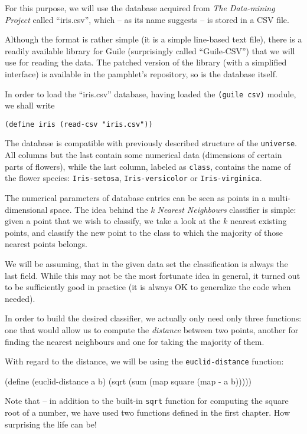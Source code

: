 For this purpose, we will use the database acquired from
\textit{The Data-mining Project} called ``iris.csv'', which
-- as its name suggests -- is stored in a CSV file.

Although the format is rather simple (it is a simple line-based
text file), there is a readily available library for Guile
(surprisingly called ``Guile-CSV'') that we will use for reading
the data. The patched version of the library (with a simplified
interface) is available in the pamphlet's repository, so is
the database itself.

In order to load the ``iris.csv'' database, having loaded
the \texttt{(guile csv)} module, we shall write 

\texttt{(define iris (read-csv "iris.csv"))}

The database is compatible with previously described structure
of the \texttt{universe}. All columns but the last contain
some numerical data (dimensions of certain parts of flowers),
while the last column, labeled as \texttt{class}, contains
the name of the flower species: \texttt{Iris-setosa},
\texttt{Iris-versicolor} or \texttt{Iris-virginica}.

The numerical parameters of database entries can be seen
as points in a multi-dimensional space. The idea behind
the \textit{k Nearest Neighbours} classifier is simple:
given a point that we wish to classify, we take a look
at the $k$ nearest existing points, and classify the new
point to the class to which the majority of those nearest
points belongs.

We will be assuming, that in the given data set
the classification is always the last field. While
this may not be the most fortunate idea in general,
it turned out to be sufficiently good in practice
(it is always OK to generalize the code when needed).

In order to build the desired classifier, we actually
only need only three functions: one that would allow
us to compute the \textit{distance} between two points,
another for finding the nearest neighbours and one for
taking the majority of them.

With regard to the distance, we will be using the
\texttt{euclid-distance} function:

\begin{Snippet}
(define (euclid-distance a b)
  (sqrt (sum (map square (map - a b)))))
\end{Snippet}

Note that -- in addition to the built-in \texttt{sqrt} function
for computing the square root of a number, we have used two
functions defined in the first chapter. How surprising the
life can be!

